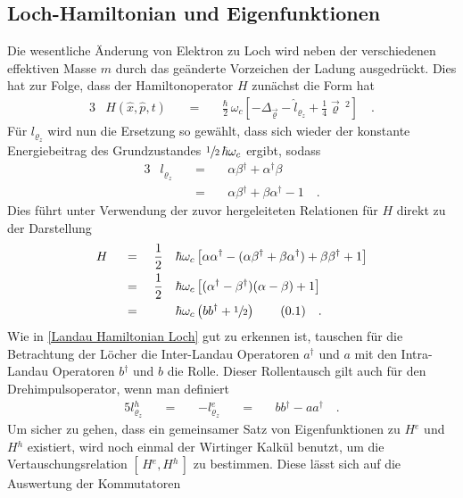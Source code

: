 \documentclass[a4paper,11pt, twoside]{article}
\newcommand{\ind}[2]{{_{#1}^{#2}}}
\newcommand{\+}{\dagger}
\newcommand{\com}[2]{[\, #1, #2 \,]}
\newcommand\numberthis{\stepcounter{equation} \tag{\thesection.\theequation}}
\renewcommand{\v}{\vec}
\renewcommand{\^}{\hat}
\renewcommand{\~}{\widetilde}
\begin{document}
\subsection{Loch-Hamiltonian und Eigenfunktionen}
Die wesentliche Änderung von Elektron zu Loch wird neben der verschiedenen effektiven Masse $m$ durch das geänderte Vorzeichen der Ladung ausgedrückt. Dies hat zur Folge, dass der Hamiltonoperator $H$ zunächst die Form hat 
\begin{alignat*}{3}
& H(\^ x,\^ p,t) && \ = \ && \frac{\hbar }{2}\,\omega_c \left [ -\Delta_{\v \varrho} - \^l_{\varrho_z}  +\frac{1}{4}\v \varrho \,^2 \right]\quad .
\end{alignat*}
Für $l_{\varrho_z}$ wird nun die Ersetzung so gewählt, dass sich wieder der konstante Energiebeitrag des Grundzustandes $\sfrac{1}{2}\,\hbar \omega_c$ ergibt, sodass 
\begin{alignat*}{3}
& l_{\varrho_z} &&\ = \ &&\alpha\beta\ind{}{\+} + \alpha\ind{}{\+}\beta \\
& &&\ =\ &&\alpha\beta\ind{}{\+} + \beta\alpha\ind{}{\+} -1 \quad .
\end{alignat*}
Dies führt unter Verwendung der zuvor hergeleiteten Relationen für $H$ direkt zu der Darstellung 
\begin{alignat*}{4}
& H &&\ = \ && \frac{1}{2}&&\hbar\omega_c \left [\alpha\alpha\ind{}{\+} -( \alpha\beta\ind{}{\+} +\beta\alpha\ind{}{\+})+\beta\beta\ind{}{\+}+1\right ] \\
& &&\ = \ && \frac{1}{2}&&\hbar\omega_c \left [(\alpha\ind{}{\+}-\beta\ind{}{\+})(\alpha-\beta)+1\right ] \\
& &&\ = \ && &&\hbar\omega_c \left (bb\ind{}{\+}+\sfrac{1}{2}\right )\numberthis \label{Landau Hamiltonian Loch} \quad .
\end{alignat*}
Wie in \eqref{Landau Hamiltonian Loch} gut zu erkennen ist, tauschen für die Betrachtung der Löcher die Inter-Landau Operatoren $a\ind{}{\+}$ und $a$ mit den Intra-Landau Operatoren $b\ind{}{\+}$ und $b$ die Rolle. Dieser Rollentausch gilt auch für den Drehimpulsoperator, wenn man definiert 
\begin{alignat*}{5}
l\ind{\varrho_z}{h} &&\ =\ && -l\ind{\varrho_z}{e} &&\ = \ && bb\ind{}{\+}-aa\ind{}{\+} \quad .
\end{alignat*}
Um sicher zu gehen, dass ein gemeinsamer Satz von Eigenfunktionen zu $H\ind{}{e}$ und $H\ind{}{h}$ existiert, wird noch einmal der Wirtinger Kalkül benutzt, um die Vertauschungsrelation $\com{H\ind{}{e}}{H\ind{}{h}}$ zu bestimmen. Diese lässt sich auf die Auswertung der Kommutatoren 
\end{document}
